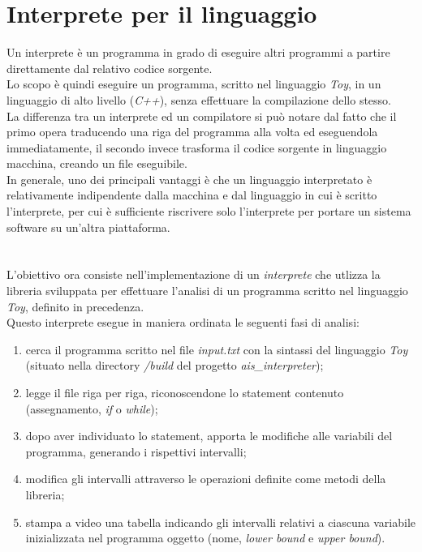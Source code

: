 \documentclass[a4paper, 10pt]{report}
\begin{document}
\section*{Interprete per il linguaggio}
Un interprete è un programma in grado di eseguire altri programmi a partire direttamente dal relativo codice sorgente.\\
Lo scopo è quindi eseguire un programma, scritto nel linguaggio \textit{Toy}, in un linguaggio di alto livello (\textit{C++}), senza effettuare la compilazione dello stesso.\\
La differenza tra un interprete ed un compilatore si può notare dal fatto che il primo opera traducendo una riga del programma alla volta ed eseguendola immediatamente, il secondo invece trasforma il codice sorgente in linguaggio macchina, creando un file eseguibile.\\
In generale, uno dei principali vantaggi è che un linguaggio interpretato è relativamente indipendente dalla macchina e dal linguaggio in cui è scritto l'interprete, per cui è sufficiente riscrivere solo l'interprete per portare un sistema software su un'altra piattaforma.
\\\\\\
L'obiettivo ora consiste nell'implementazione di un \textit{interprete} che utlizza la libreria sviluppata per effettuare l'analisi di un programma scritto nel linguaggio \textit{Toy}, definito in precedenza.\\
Questo interprete esegue in maniera ordinata le seguenti fasi di analisi:
\begin{enumerate}
	\item cerca il programma scritto nel file \textit{input.txt} con la sintassi del linguaggio \textit{Toy} (situato nella directory \textit{/build} del progetto \textit{ais\_interpreter});
	\item legge il file riga per riga, riconoscendone lo statement contenuto (assegnamento, \textit{if} o \textit{while});
	\item dopo aver individuato lo statement, apporta le modifiche alle variabili del programma, generando i rispettivi intervalli;
	\item modifica gli intervalli attraverso le operazioni definite come metodi della libreria;
	\item stampa a video una tabella indicando gli intervalli relativi a ciascuna variabile inizializzata nel programma oggetto (nome, \textit{lower bound} e \textit{upper bound}).
	\newline
\end{enumerate}
\end{document}
